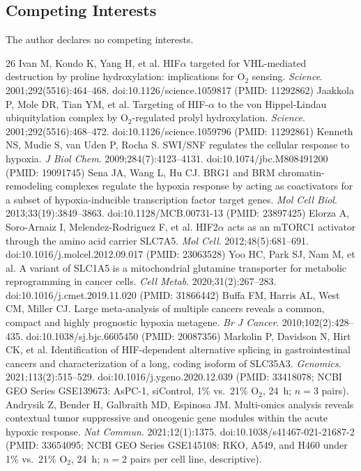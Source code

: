 \documentclass[11pt]{article}
\begin{document}
\subsection*{Competing Interests}
The author declares no competing interests.

\begin{thebibliography}{26}
 Ivan M, Kondo K, Yang H, et al. HIF$\alpha$ targeted for VHL-mediated destruction by proline hydroxylation: implications for O$_2$ sensing. \textit{Science}. 2001;292(5516):464--468. doi:10.1126/science.1059817 (PMID: 11292862)
 Jaakkola P, Mole DR, Tian YM, et al. Targeting of HIF-$\alpha$ to the von Hippel-Lindau ubiquitylation complex by O$_2$-regulated prolyl hydroxylation. \textit{Science}. 2001;292(5516):468--472. doi:10.1126/science.1059796 (PMID: 11292861)
 Kenneth NS, Mudie S, van Uden P, Rocha S. SWI/SNF regulates the cellular response to hypoxia. \textit{J Biol Chem}. 2009;284(7):4123--4131. doi:10.1074/jbc.M808491200 (PMID: 19091745)
 Sena JA, Wang L, Hu CJ. BRG1 and BRM chromatin-remodeling complexes regulate the hypoxia response by acting as coactivators for a subset of hypoxia-inducible transcription factor target genes. \textit{Mol Cell Biol}. 2013;33(19):3849--3863. doi:10.1128/MCB.00731-13 (PMID: 23897425)
 Elorza A, Soro-Arnaiz I, Melendez-Rodriguez F, et al. HIF2$\alpha$ acts as an mTORC1 activator through the amino acid carrier SLC7A5. \textit{Mol Cell}. 2012;48(5):681--691. doi:10.1016/j.molcel.2012.09.017 (PMID: 23063528)
 Yoo HC, Park SJ, Nam M, et al. A variant of SLC1A5 is a mitochondrial glutamine transporter for metabolic reprogramming in cancer cells. \textit{Cell Metab}. 2020;31(2):267--283. doi:10.1016/j.cmet.2019.11.020 (PMID: 31866442)
 Buffa FM, Harris AL, West CM, Miller CJ. Large meta-analysis of multiple cancers reveals a common, compact and highly prognostic hypoxia metagene. \textit{Br J Cancer}. 2010;102(2):428--435. doi:10.1038/sj.bjc.6605450 (PMID: 20087356)
 Markolin P, Davidson N, Hirt CK, et al. Identification of HIF-dependent alternative splicing in gastrointestinal cancers and characterization of a long, coding isoform of SLC35A3. \textit{Genomics}. 2021;113(2):515--529. doi:10.1016/j.ygeno.2020.12.039 (PMID: 33418078; NCBI GEO Series GSE139673: AsPC-1, siControl, 1\% vs.\ 21\% $\text{O}_2$, 24~h; $n = 3$ pairs).
 Andrysik Z, Bender H, Galbraith MD, Espinosa JM. Multi-omics analysis reveals contextual tumor suppressive and oncogenic gene modules within the acute hypoxic response. \textit{Nat Commun}. 2021;12(1):1375. doi:10.1038/s41467-021-21687-2 (PMID: 33654095; NCBI GEO Series GSE145108: RKO, A549, and H460 under 1\% vs.\ 21\% $\text{O}_2$, 24~h; $n = 2$ pairs per cell line, descriptive).

\end{thebibliography}
\end{document}
